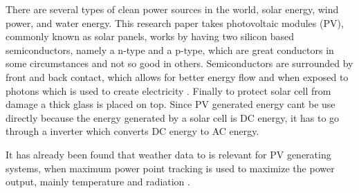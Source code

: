 There are several types of clean power sources in the world, solar energy, wind power, and water energy.
 This research paper takes photovoltaic modules (PV), commonly known as solar panels, works by
having two silicon based semiconductors, namely a n-type and a p-type, which are great conductors in some circumstances and not so good in others. Semiconductors are surrounded by front and back contact, which allows for better energy flow and when exposed to photons which is used to
create electricity \citep{photovoltaic}. Finally to protect solar cell from damage a thick glass is placed on top. Since PV generated energy cant be use directly because the energy generated by a solar cell is DC energy, it has to go through a inverter which converts DC energy to AC energy.

It has already been found that weather data to is relevant for PV
generating systems, when maximum power point tracking is used to
maximize the power output, mainly temperature and radiation \citep{mppt2004}.



